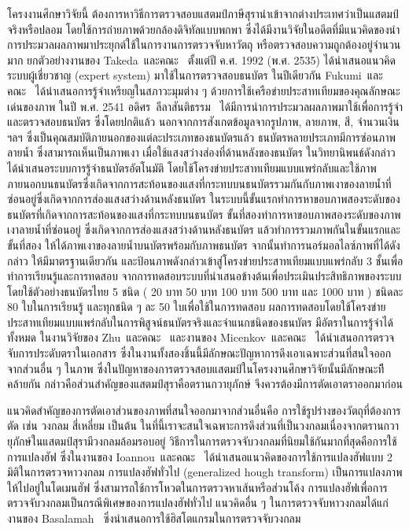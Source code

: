 โครงงานศึกษาวิจัยนี้  ต้องการหาวิธีการตรวจสอบแสตมป์ภาษีสุรานำเข้าจากต่างประเทศว่าเป็นแสตมป์จริงหรือปลอม โดยใช้การถ่ายภาพด้วยกล้องดิจิทัลแบบพกพา ซึ่งได้มีงานวิจัยในอดีตที่มีแนวคิดของนำการประมวลผลภาพมาประยุกต์ใช้ในการงานการตรวจจับหาวัตถุ หรือตรวจสอบความถูกต้องอยู่จำนวนมาก ยกตัวอย่างงานของ Takeda~และคณะ~\cite{takeda1992expert} ตั้งแต่ปี ค.ศ. 1992 (พ.ศ.​ 2535) ได้นำเสนอแนวคิดระบบผู้เชี่ยวชาญ (expert system) มาใช้ในการตรวจสอบธนบัตร ในปีเดียวกัน Fukumi~และคณะ~\cite{fukumi1992rotation} ได้นำเสนอการรู้จำเหรียญในสภาวะมุมต่าง ๆ ด้วยการใช้เครือข่ายประสาทเทียมของคุณลักษณะเด่นของภาพ ในปี พ.ศ. 2541 อดิศร~ลีลาสันติธรรม~\cite{Adisorn41} ได้มีการนำการประมวลผลภาพมาใช้เพื่อการรู้จำและตรวจสอบธนบัตร  ซึ่งโดยปกติแล้ว นอกจากการสังเกตข้อมูลจากรูปภาพ, ลายภาพ, สี, จำนวนเงิน ฯลฯ ซึ่งเป็นคุณสมบัติภายนอกของแต่ละประเภทของธนบัตรแล้ว  ธนบัตรหลายประเภทมีการซ่อนภาพลายน้ำ  ซึ่งสามารถเห็นเป็นภาพเงา
เมื่อใช้แสงสว่างส่องที่ด้านหลังของธนบัตร  ในวิทยานิพนธ์ดังกล่าว ได้นำเสนอระบบการรู้จำธนบัตรอัตโนมัติ โดยใช้โครงข่ายประสาทเทียมแบบแพร่กลับและใช้ภาพภายนอกบนธนบัตรซึ่งเกิดจากการสะท้อนของแสงที่กระทบบนธนบัตรรวมกันกับภาพเงาของลายน้ำที่ซ่อนอยู่ซึ่งเกิดจากการส่องแสงสว่างด้านหลังธนบัตร  ในระบบนี้ขั้นแรกทำการหาขอบภาพสองระดับของธนบัตรที่เกิดจากการสะท้อนของแสงที่กระทบบนธนบัตร ขั้นที่สองทำการหาขอบภาพสองระดับของภาพเงาลายน้ำที่ซ่อนอยู่ 
ซึ่งเกิดจากการส่องแสงสว่างด้านหลังธนบัตร แล้วทำการรวมภาพกันในขั้นแรกและขั้นที่สอง ให้ได้ภาพเงาของลายน้ำบนบัตรพร้อมกับภาพธนบัตร จากนั้นทำการนอร์มอลไลซ์ภาพที่ได้ดังกล่าว          ให้มีมาตรฐานเดียวกัน และป้อนภาพดังกล่าวเข้าสู่โครงข่ายประสาทเทียมแบบแพร่กลับ 3 ชั้นเพื่อทำการเรียนรู้และการทดสอบ จากการทดสอบระบบที่นำเสนอข้างต้นเพื่อประเมินประสิทธิภาพของระบบ โดยใช้ตัวอย่างธนบัตรไทย 5 ชนิด  ( 20 บาท  50 บาท  100 บาท  500 บาท และ 1000 บาท ) ชนิดละ 80 ใบในการเรียนรู้ และทุกชนิด ๆ ละ 50 ใบเพื่อใช้ในการทดสอบ ผลการทดสอบโดยใช้โครงข่ายประสาทเทียมแบบแพร่กลับในการพิสูจน์ธนบัตรจริงและจำแนกชนิดของธนบัตร มีอัตราในการรู้จำได้ทั้งหมด  ในงานวิจัยของ Zhu~และคณะ~\cite{zhu2006robust} และงานของ Micenkov~และคณะ~\cite{micenkov2011stamp} ได้นำเสนอการตรวจจับการประดับตราในเอกสาร ซึ่งในงานทั้งสองชิ้นนี้มีลักษณะปัญหาการดึงเอาเฉพาะส่วนที่สนใจออกจากส่วนอื่น ๆ ในภาพ ซึ่งในปัญหาของการตรวจสอบแสตมป์ในโครงงานศึกษาวิจัยนั้นมีลักษณะทีีคล้ายกัน กล่าวคือส่วนสำคัญของแสตมป์สุราคือตรานกวายุภักษ์ จึงควรต้องมีการตัดเอาตราออกมาก่อน

แนวคิดสำคัญของการตัดเอาส่วนของภาพที่สนใจออกมาจากส่วนอื่นคือ การใช้รูปร่างของวัตถุที่ต้องการตัด เช่น วงกลม สี่เหลี่ยม เป็นต้น ในที่นี้เราจะสนใจเฉพาะการดึงส่วนที่เป็นวงกลมเนื่องจากตรานกวายุภักษ์ในแสตมป์สุรามีวงกลมล้อมรอบอยู่ วิธีการในการตรวจจับวงกลมที่นิยมใช้กันมากที่สุดคือการใช้การแปลงฮัฟ ซึ่งในงานของ Ioannou~และคณะ~\cite{ioannou1999circle} ได้นำเสนอแนวคิดของการใช้การแปลงฮัฟแบบ 2 มิติในการตรวจหาวงกลม การแปลงฮัฟทั่วไป (generalized hough transform) เป็นการแปลงภาพให้ไปอยู่ในโดเมนฮัฟ ซึ่งสามารถใช้การโหวตในการตรวจหาเส้นหรือส่วนโค้ง การแปลงฮัฟเพื่อการตรวจจับวงกลมเป็นกรณีพิเศษของการแปลงฮัฟทั่วไป แนวคิดอื่น ๆ ในการตรวจจับหาวงกลมได้แก่ งานของ Basalamah~\cite{basalamah2012histogram} ซึ่งนำเสนอการใช้ฮิสโตแกรมในการตรวจจับวงกลม

